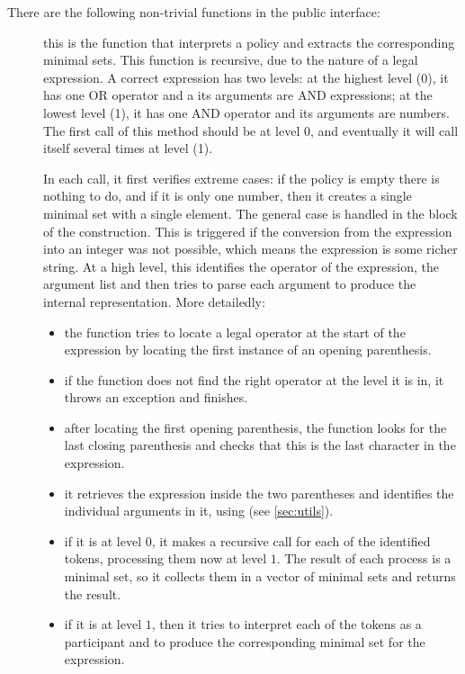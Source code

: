 \documentclass{article}
\begin{document}
There are the following non-trivial functions in the public interface:
\begin{description}
\item[] this is the function that interprets a policy and extracts the corresponding minimal sets. This function is recursive, due to the nature of a legal expression. A correct expression has two levels: at the highest level (0), it has one OR operator and a its arguments are AND expressions; at the lowest level (1), it has one AND operator and its arguments are numbers. The first call of this method should be at level $0$, and eventually it will call itself several times at level (1). 

In each call, it first verifies extreme cases: if the policy is empty there is nothing to do, and if it is only one number, then it creates a single minimal set with a single element. The general case is handled in the  block of the  construction. This is triggered if the conversion from the expression into an integer was not possible, which means the expression is some richer string. At a high level, this identifies the operator of the expression, the argument list and then tries to parse each argument to produce the internal representation. More detailedly:
\begin{itemize}
\item the function tries to locate a legal operator at the start of the expression by locating the first instance of an opening parenthesis.
\item if the function does not find the right operator at the level it is in, it throws an exception and finishes.
\item after locating the first opening parenthesis, the function looks for the last closing parenthesis and checks that this is the last character in the expression. 
\item it retrieves the expression inside the two parentheses and identifies the individual arguments in it, using  (see \ref{sec:utils}).
\item if it is at level $0$, it makes a recursive call for each of the identified tokens, processing them now at level $1$. The result of each process is a minimal set, so it collects them in a vector of minimal sets and returns the result.
\item if it is at level $1$, then it tries to interpret each of the tokens as a participant and to produce the corresponding minimal set for the  expression. 
\end{itemize}



\end{description}
\end{document}
